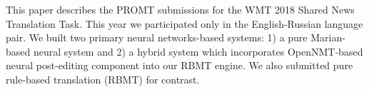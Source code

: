 This paper describes the PROMT submissions for the WMT 2018 Shared News Translation Task. This year we participated only in the English-Russian language pair. We built two primary neural networks-based systems: 1) a pure Marian-based neural system and 2) a hybrid system which incorporates OpenNMT-based neural post-editing component into our RBMT engine. We also submitted pure rule-based translation (RBMT) for contrast.
